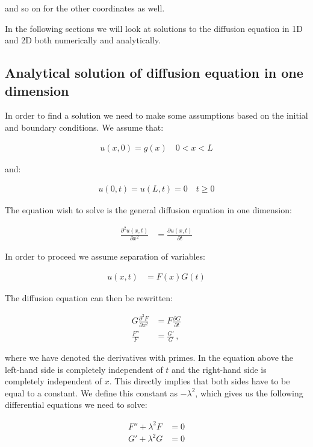 \documentclass[reprint,english,notitlepage]{revtex4-1}  %
\begin{document}
and so on for the other coordinates as well.
 
In the following sections we will look at solutions to the diffusion equation in 1D and 2D both numerically and analytically.




\subsection{Analytical solution of diffusion equation in one dimension} \label{sec:formalism_1D_diff_eq_analytical}

In order to find a solution we need to make some assumptions based on the initial and boundary conditions. We assume that:

\begin{align*}
u(x,0) = g(x) \quad 0 < x < L
\end{align*}

and:

\begin{align*}
u(0,t) = u(L,t) = 0 \quad t \geq 0
\end{align*}

The equation wish to solve is the general diffusion equation in one dimension:

\begin{align*}
\frac{\partial^2 u(x,t)}{\partial x^2} &= \frac{\partial u(x,t)}{\partial t}
\end{align*}

In order to proceed we assume separation of variables:

\begin{align*}
u(x,t) &= F(x)G(t) 
\end{align*}

The diffusion equation can then be rewritten:

\begin{align*}
G \frac{\partial^2 F}{\partial x^2} &= F \frac{\partial G}{\partial t} \\
\frac{F''}{F} &= \frac{G'}{G} \, ,
\end{align*}

where we have denoted the derivatives with primes. In the equation above the left-hand side is completely independent of $t$ and the right-hand side is completely independent of $x$. This directly implies that both sides have to be equal to a constant. We define this constant as $-\lambda^2$, which gives us the following differential equations we need to solve:

\begin{align*}
F'' + \lambda^2 F &= 0 \\
G' + \lambda^2 G &= 0
\end{align*}
\end{document}

